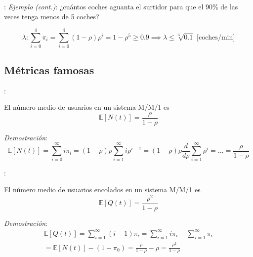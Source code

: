 \documentclass{beamer}
\begin{document}
\begin{frame}{\secname: \subsecname}
    \textit{Ejemplo (cont.)}: ¿cuántos coches
    aguanta el surtidor para que el 90\%
    de las veces tenga menos de 5 coches?

    \begin{equation*}
        \lambda: \sum_{i=0}^4 \pi_i = \sum_{i=0}^4 (1-\rho)\rho^i = 1-\rho^5  \geq 0.9
        \implies\lambda\leq \sqrt[5]{0.1} \text{ [coches/min]}
    \end{equation*}

    \begin{figure}
        
    \end{figure}
\end{frame}




\subsection{Métricas famosas}

\begin{frame}{\secname: \subsecname}
    \begin{lemma}
        El número medio de usuarios en
        un sistema M/M/1 es
        \begin{equation}
            \mathbb{E}[N(t)]=\frac{\rho}{1-\rho}
        \end{equation}
    \end{lemma}

    \vfill

    \textit{Demostración}:
    \begin{equation*}
        \mathbb{E}[N(t)]=
        \sum_{i=0}^\infty i \pi_i
        =(1-\rho)\rho \sum_{i=1}^\infty i\rho^{i-1}
        = (1-\rho)\rho \frac{d}{d\rho}\sum_{i=1}^\infty \rho^i = \ldots = \frac{\rho}{1-\rho}
    \end{equation*}
\end{frame}



\begin{frame}{\secname: \subsecname}
    \begin{lemma}
        El número medio de usuarios encolados
        en un sistema M/M/1 es
        \begin{equation}
            \mathbb{E}[Q(t)]=\frac{\rho^2}{1-\rho}
        \end{equation}

    \end{lemma}

    \vfill
    \textit{Demostración}:
    \begin{multline*}
        \mathbb{E}[Q(t)]=
        \sum_{i=1}^\infty (i-1) \pi_i
        = \sum_{i=1}^\infty i\pi_i -
        \sum_{i=1}^\infty \pi_i\\
        = \mathbb{E}[N(t)] - (1-\pi_0)
        = \frac{\rho}{1-\rho} - \rho
        = \frac{\rho^2}{1-\rho}
    \end{multline*}
\end{frame}
\end{document}
